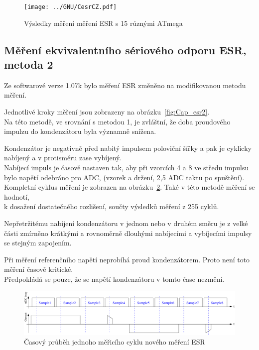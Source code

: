 \begin{figure}[H]
\centering
\texttt{[image: ../GNU/CesrCZ.pdf]}
\caption{Výsledky měření měření ESR s 15 různými ATmega}
\label{fig:Cesr}
\end{figure}

\newpage
\subsection{Měření ekvivalentního sériového odporu ESR, metoda 2}
\label{sec:ESR2}
Ze softwarové verze 1.07k bylo měření ESR změněno na modifikovanou metodu měření.

Jednotlivé kroky měření jsou zobrazeny na obrázku~\ref{fig:Cap_esr2}.\\ Na této metodě, ve srovnání s metodou 1, je zvláštní, že doba proudového impulzu do kondenzátoru byla významně snížena.

Kondenzátor je negativně před nabitý impulsem poloviční šířky a pak je cyklicky nabíjený a v protisměru
zase vybíjený.\\
Nabíjecí impuls je časově nastaven tak, aby při vzorcích 4 a 8 ve středu impulsu bylo napětí odebráno pro ADC, (vzorek a držení, 2,5 ADC taktu po spuštění).\\
Kompletní cyklus měření je zobrazen na obrázku~\ref{fig:Cap_esr2_timing}. Také v této metodě měření se hodnotí,\\  k dosažení dostatečného rozlišení, součty výsledků měření z 255 cyklů.

Nepřetržitému nabíjení kondenzátoru v jednom nebo v druhém směru je z velké části zmírněno krátkými a
rovnoměrně dlouhými nabíjecími a vybíjecími impulsy se stejným zapojením.

Při měření referenčního napětí neprobíhá proud kondenzátorem. Proto není toto měření časově kritické.\\ Předpokládá se pouze, že se napětí kondenzátoru v tomto čase nezmění.

\begin{figure}[H]
  \centering
    \includegraphics[width=18cm]{../FIG/Cap_esr2_timing.pdf}
  \caption{Časový průběh jednoho měřicího cyklu nového měření ESR}
  \label{fig:Cap_esr2_timing}
\end{figure}

